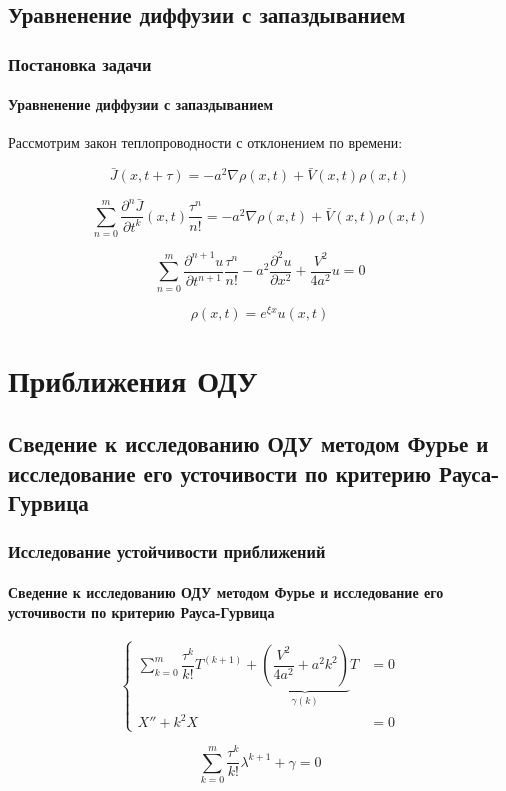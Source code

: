 \documentclass{beamer}
\numberwithin{equation}{section}
\begin{document}
    \subsection{Уравненение диффузии с запаздыванием}
    \begin{frame}
        \frametitle{Постановка задачи}
        \framesubtitle{Уравненение диффузии с запаздыванием}

        Рассмотрим закон теплопроводности с отклонением по времени:

        \begin{equation}
            \bar{J}(x,t+\tau) = -a^2 \nabla \rho(x,t) + \bar{V}(x,t) \rho(x,t)
        \end{equation}

        \begin{equation}
            \sum\limits_{n=0}^{m} \dfrac{\partial^n \bar{J}}{\partial t^k}(x,t) \dfrac{\tau^n}{n!} = -a^2 \nabla \rho(x,t) + \bar{V}(x,t) \rho(x,t)
        \end{equation}

        \begin{equation}
            \sum\limits_{n=0}^{m} \dfrac{\partial^{n+1} u}{\partial t^{n+1}} \dfrac{\tau^n}{n!} - a^2 \dfrac{\partial^2 u}{\partial x^2} + \dfrac{V^2}{4a^2} u = 0
        \end{equation}

        \begin{equation}
            \rho(x,t) = e^{\xi x} u(x,t)
        \end{equation}

    \end{frame}

    \section{Приближения ОДУ}
    \subsection{Сведение к исследованию ОДУ методом Фурье и исследование его усточивости по критерию Рауса-Гурвица}
    \begin{frame}
        \frametitle{Исследование устойчивости приближений}
        \framesubtitle{Сведение к исследованию ОДУ методом Фурье и исследование его усточивости по критерию Рауса-Гурвица}

        \begin{equation}
            \left\{
            \begin{aligned}
                \sum\limits_{k=0}^{m} \dfrac{\tau^k}{k!} T^{(k+1)} + \underbrace{ \left( \dfrac{V^2}{4a^2} + a^2 k^2 \right)}_{\gamma(k)} T & = 0\\
                X'' + k^2 X & = 0
            \end{aligned}
            \right.
        \end{equation}

        \begin{equation}
            \sum\limits_{k=0}^{m} \dfrac{\tau^k}{k!} \lambda^{k+1} + {\gamma} = 0
        \end{equation}

    \end{frame}
\end{document}
